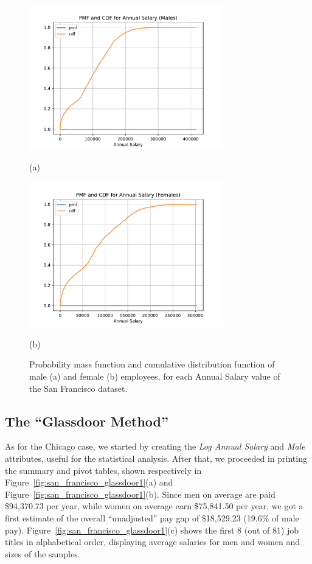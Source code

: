 \begin{figure}[t!]
\centering
\includegraphics[width=0.75\textwidth]{figures/san_francisco_pmf_cdf_annual_salary_males.pdf}
\caption*{(a)}
\includegraphics[width=0.75\textwidth]{figures/san_francisco_pmf_cdf_annual_salary_females.pdf}
\caption*{(b)}
\caption{Probability mass function and cumulative distribution function of male (a) and female (b) employees, for each \textrm{Annual Salary} value of the San Francisco dataset.}
\label{fig:san_francisco_preprocessing2}
\end{figure}


\subsection{The ``Glassdoor Method''}
As for the Chicago case, we started by creating the \textit{Log Annual Salary} and \textit{Male} attributes, useful for the statistical analysis. After that, we proceeded in printing the summary and pivot tables, shown respectively in Figure~\ref{fig:san_francisco_glassdoor1}(a) and Figure~\ref{fig:san_francisco_glassdoor1}(b). Since men on average are paid \$94,370.73 per year, while women on average earn \$75,841.50 per year, we got a first estimate of the overall ``unadjusted'' pay gap of \$18,529.23 (19.6\% of male pay). Figure~\ref{fig:san_francisco_glassdoor1}(c) shows the first 8 (out of 81) job titles in alphabetical order, displaying average salaries for men and women and sizes of the samples.

